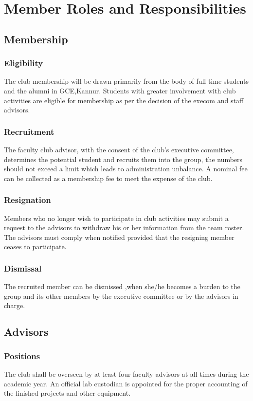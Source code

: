 \chapter{Member Roles and Responsibilities}

\section{Membership}

\subsection{Eligibility}
The club membership will be drawn primarily from the body of full-time students and the alumni in GCE,Kannur. Students with greater involvement with club activities are eligible for membership as per the decision of the execom and staff advisors.

\subsection{Recruitment}
The faculty club advisor, with the consent of the club’s executive committee, determines the potential student and recruits them into the group, the numbers should not exceed a limit which leads to administration unbalance. A nominal fee can be collected as a membership fee to meet the expense of the club. 

\subsection{Resignation}
Members who no longer wish to participate in club activities may submit a request to the advisors to withdraw his or her information from the team roster. The advisors must comply when notified provided that the resigning member ceases to participate.

\subsection{Dismissal}
The recruited member can be dismissed ,when she/he becomes a burden to the group and its other members by the executive committee or by the advisors in charge.

\section{Advisors}

\subsection{Positions}
The club shall be overseen by at least four faculty advisors at all times during the academic year. An official lab custodian is appointed for the proper accounting of the finished projects and other equipment.

